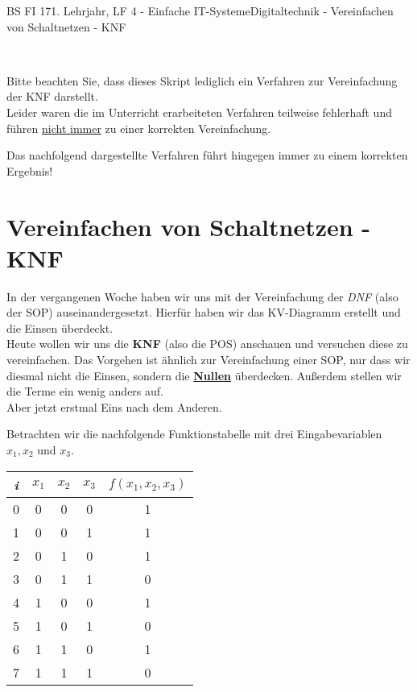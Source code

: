 \documentclass[11pt,twocolumn,oneside,openany,headings=optiontotoc,11pt,numbers=noenddot]{article}
\begin{document}
	\begin{worksheet}{BS FI 17}{1. Lehrjahr, LF 4 - Einfache IT-Systeme}{Digitaltechnik - Vereinfachen von Schaltnetzen - KNF}
		\begin{framed}
			\centering{}\\
			\normalcolor\raggedright Bitte beachten Sie, dass dieses Skript lediglich ein Verfahren zur Vereinfachung der KNF darstellt.\\
			Leider waren die im Unterricht erarbeiteten Verfahren teilweise fehlerhaft und führen \underline{nicht immer} zu einer korrekten Vereinfachung.\\
			\par\noindent
			Das nachfolgend dargestellte Verfahren führt hingegen immer zu einem korrekten Ergebnis!
		\end{framed}
		\setcounter{section}{1}
		\section{Vereinfachen von Schaltnetzen - KNF}
		In der vergangenen Woche haben wir uns mit der Vereinfachung der \textit{DNF} (also der SOP) auseinandergesetzt. Hierfür haben wir das KV-Diagramm erstellt und die Einsen überdeckt.\\
		Heute wollen wir uns die \textbf{KNF} (also die POS) anschauen und versuchen diese zu vereinfachen. Das Vorgehen ist ähnlich zur Vereinfachung einer SOP, nur dass wir diesmal nicht die Einsen, sondern die \textbf{\underline{Nullen}} überdecken. Außerdem stellen wir die Terme ein wenig anders auf.\\
		Aber jetzt erstmal Eins nach dem Anderen.\\
		\par\noindent
		Betrachten wir die nachfolgende Funktionstabelle mit drei Eingabevariablen \(x_1, x_2\) und \(x_3\).
		\begin{center}
			\begin{tabular}{|c|ccc|c|}
				\hline
				\textit{i} & \(x_1\) & \(x_2\) & \(x_3\) & \(f(x_1,x_2,x_3)\)\\
				\hline
				0 & 0 & 0 & 0 & 1\\
				\hline
				1 & 0 & 0 & 1 & 1\\
				\hline
				2 & 0 & 1 & 0 & 1\\
				\hline
				3 & 0 & 1 & 1 & 0\\
				\hline
				4 & 1 & 0 & 0 & 1\\
				\hline
				5 & 1 & 0 & 1 & 0\\
				\hline
				6 & 1 & 1 & 0 & 1\\
				\hline
				7 & 1 & 1 & 1 & 0\\
				\hline
			\end{tabular}
		\end{center}

\end{worksheet}
\end{document}
